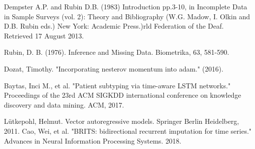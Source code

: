 \documentclass[11pt]{report}           %
\begin{document}





%


\appendix
%
%



\medskip



\begin{thebibliography}{80}



Dempster A.P. and Rubin D.B. (1983) Introduction pp.3-10, in Incomplete Data in Sample Surveys (vol. 2): Theory and Bibliography (W.G. Madow, I. Olkin and D.B. Rubin eds.) New York: Academic Press.)rld Federation of the Deaf. Retrieved 17 August 2013.
 
 Rubin, D. B. (1976). Inference and Missing Data. Biometrika, 63, 581-590. 

  Dozat, Timothy. "Incorporating nesterov momentum into adam." (2016).
 
 Baytas, Inci M., et al. "Patient subtyping via time-aware LSTM networks." Proceedings of the 23rd ACM SIGKDD international conference on knowledge discovery and data mining. ACM, 2017.
 
 Lütkepohl, Helmut. Vector autoregressive models. Springer Berlin Heidelberg, 2011.
 Cao, Wei, et al. "BRITS: bidirectional recurrent imputation for time series." Advances in Neural Information Processing Systems. 2018.
 

\end{thebibliography}
\end{document}
